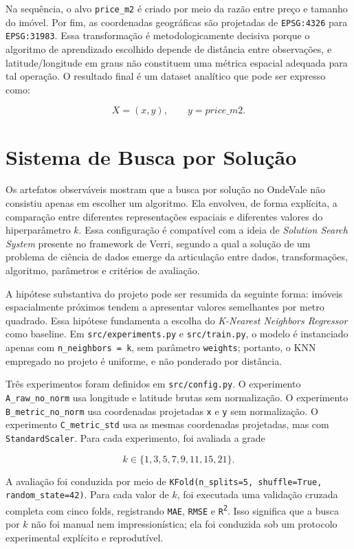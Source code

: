 \documentclass[12pt]{report}
\begin{document}
Na sequência, o alvo \texttt{price\_m2} é criado por meio da razão entre preço e tamanho do imóvel. Por fim, as coordenadas geográficas são projetadas de \texttt{EPSG:4326} para \texttt{EPSG:31983}. Essa transformação é metodologicamente decisiva porque o algoritmo de aprendizado escolhido depende de distância entre observações, e latitude/longitude em graus não constituem uma métrica espacial adequada para tal operação. O resultado final é um dataset analítico que pode ser expresso como:

\[
X = (x,y), \qquad y = price\_m2.
\]

\chapter{Sistema de Busca por Solução}

Os artefatos observáveis mostram que a busca por solução no OndeVale não consistiu apenas em escolher um algoritmo. Ela envolveu, de forma explícita, a comparação entre diferentes representações espaciais e diferentes valores do hiperparâmetro $k$. Essa configuração é compatível com a ideia de \textit{Solution Search System} presente no framework de Verri, segundo a qual a solução de um problema de ciência de dados emerge da articulação entre dados, transformações, algoritmo, parâmetros e critérios de avaliação.

A hipótese substantiva do projeto pode ser resumida da seguinte forma: imóveis espacialmente próximos tendem a apresentar valores semelhantes por metro quadrado. Essa hipótese fundamenta a escolha do \textit{K-Nearest Neighbors Regressor} como baseline. Em \texttt{src/experiments.py} e \texttt{src/train.py}, o modelo é instanciado apenas com \texttt{n\_neighbors = k}, sem parâmetro \texttt{weights}; portanto, o KNN empregado no projeto é uniforme, e não ponderado por distância.

Três experimentos foram definidos em \texttt{src/config.py}. O experimento \texttt{A\_raw\_no\_norm} usa longitude e latitude brutas sem normalização. O experimento \texttt{B\_metric\_no\_norm} usa coordenadas projetadas \texttt{x} e \texttt{y} sem normalização. O experimento \texttt{C\_metric\_std} usa as mesmas coordenadas projetadas, mas com \texttt{StandardScaler}. Para cada experimento, foi avaliada a grade

\[
k \in \{1, 3, 5, 7, 9, 11, 15, 21\}.
\]

A avaliação foi conduzida por meio de \texttt{KFold(n\_splits=5, shuffle=True, random\_state=42)}. Para cada valor de $k$, foi executada uma validação cruzada completa com cinco folds, registrando \texttt{MAE}, \texttt{RMSE} e \texttt{R\textsuperscript{2}}. Isso significa que a busca por $k$ não foi manual nem impressionística; ela foi conduzida sob um protocolo experimental explícito e reprodutível.
\end{document}
